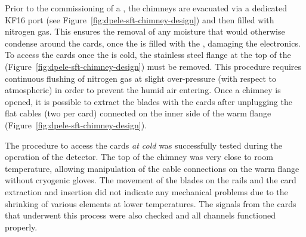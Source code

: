 Prior to the commissioning of a , the chimneys are evacuated via a dedicated KF16 port (see Figure~\ref{fig:dpele-sft-chimney-design}) and then filled with nitrogen gas. This ensures the removal of %
any moisture that would otherwise condense around the  cards, once the  is filled with the \lar, damaging the electronics. To access the  cards once the  is cold, the stainless steel flange at the top of the  (Figure~\ref{fig:dpele-sft-chimney-design}) must be removed. This procedure requires continuous flushing of nitrogen gas at slight over-pressure (with respect to atmospheric) in order to prevent the humid air entering. %
Once a chimney is opened, it is possible to extract the blades with the  cards after unplugging the flat cables (two per card) connected on the inner side of the warm flange (Figure~\ref{fig:dpele-sft-chimney-design}).

The procedure to access the  cards \textit{at cold} was successfully tested during the operation of the  detector. The %
top of the chimney was very close to room temperature, allowing manipulation of the cable connections on the warm \fdth flange without %
cryogenic gloves. The movement of the blades on the rails and the  card extraction and insertion did not indicate any mechanical problems %
due to the shrinking of various elements %
at lower temperatures.  The signals from the  cards that underwent %
this process were also checked and %
all channels functioned properly.


